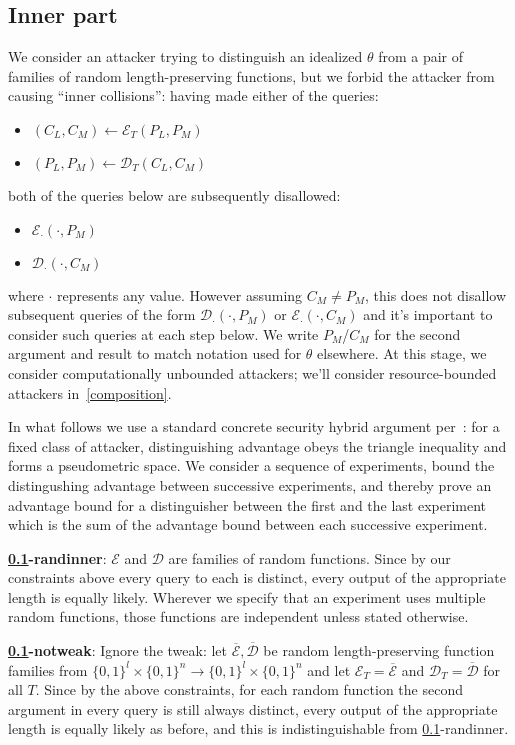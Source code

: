 \documentclass[letterpaper,luatex,11pt]{article}
\newcommand*{\xprm}[2]{\textsf{\ref*{#1}-#2}}
\newcommand*{\xprmtitle}[2]{\textbf{\xprm{#1}{#2}}}
\newcommand*{\calE}{\mathcal{E}}
\newcommand*{\calD}{\mathcal{D}}
\newcommand*{\barE}{\overline{\calE}}
\newcommand*{\barD}{\overline{\calD}}
\begin{document}
\subsection{Inner part}\label{innerpart}

We consider an attacker trying to distinguish an idealized $\theta$ from a
pair of families of random length-preserving functions,
but we forbid the attacker from causing ``inner collisions'':
having made either of the queries: \label{constraints}
\begin{itemize}
    \item $(C_L, C_M) \leftarrow \calE_T(P_L, P_M)$
    \item $(P_L, P_M) \leftarrow \calD_T(C_L, C_M)$
\end{itemize}
both of the queries below are subsequently disallowed:
\begin{itemize}
    \item $\calE_\cdotp(\cdotp, P_M)$
    \item $\calD_\cdotp(\cdotp, C_M)$
\end{itemize}
where $\cdotp$ represents any value. However assuming $C_M \neq P_M$, this does not disallow
subsequent queries of the form $\calD_\cdotp(\cdotp, P_M)$ or $\calE_\cdotp(\cdotp, C_M)$
and it's important to consider such queries at each step below. We write
$P_M$/$C_M$ for the second argument and result to match notation used for $\theta$ elsewhere.
At this stage, we consider computationally unbounded attackers; we'll consider resource-bounded
attackers in~\autoref{composition}.

In what follows we use a standard concrete security hybrid argument per~\cite{concrete,games}:
for a fixed class of attacker, distinguishing advantage obeys the triangle inequality and
forms a pseudometric space. We consider a
sequence of experiments, bound the distingushing advantage between successive
experiments, and thereby
prove an advantage bound for a distinguisher between the first and the last experiment
which is the sum of the advantage bound between each successive experiment.

\xprmtitle{innerpart}{randinner}: $\calE$ and $\calD$ are families of
random functions. Since by our constraints above every query to each
is distinct, every output of the
appropriate length is equally likely. Wherever we specify that an experiment uses multiple random
functions, those functions are independent unless stated otherwise.

\xprmtitle{innerpart}{notweak}: Ignore the tweak: let
$\barE, \barD$ be random length-preserving function families from
$\{0,1\}^l \times \{0,1\}^n \rightarrow \{0,1\}^l \times \{0,1\}^n$
and let $\calE_T = \barE$ and $\calD_T = \barD$ for all $T$.
Since by the above constraints, for each random function the second argument in every query
is still always distinct, every output of the appropriate length is equally
likely as before, and this is indistinguishable from \xprm{innerpart}{randinner}.
\end{document}
